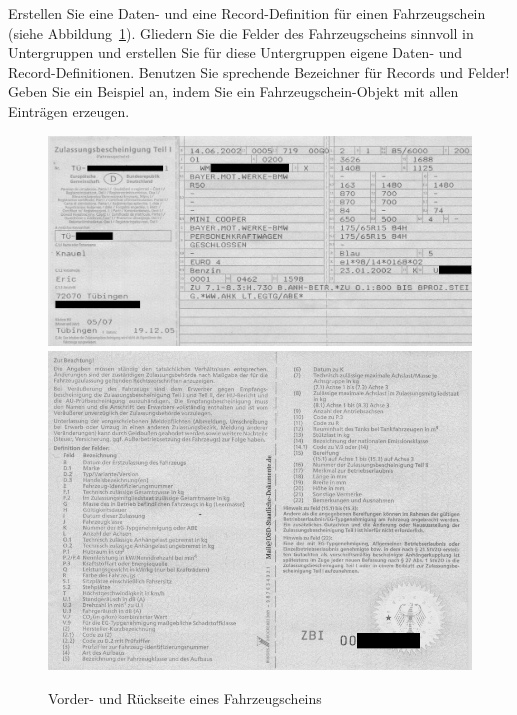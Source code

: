 \begin{aufgabe}

  Erstellen Sie eine Daten- und eine Record-Definition für einen
    Fahrzeugschein (siehe Abbildung~\ref{fig:fahrzeugschein}).  Gliedern Sie die Felder des
    Fahrzeugscheins sinnvoll in Untergruppen und erstellen Sie für diese
    Untergruppen eigene Daten- und Record-Definitionen.  Benutzen Sie
    sprechende Bezeichner für Records und Felder!  Geben Sie ein
    Beispiel an, indem Sie ein Fahrzeugschein-Objekt mit allen Einträgen
    erzeugen.
    
    
    \begin{figure}[tb]
      \begin{center}
        \includegraphics[width=\linewidth]{i1zus/kfzschein-front}\\
        \medskip
        \includegraphics[width=\linewidth]{i1zus/kfzschein-back}
      \end{center}
      \caption{Vorder- und Rückseite eines Fahrzeugscheins}
      \label{fig:fahrzeugschein}
    \end{figure}
\end{aufgabe}

